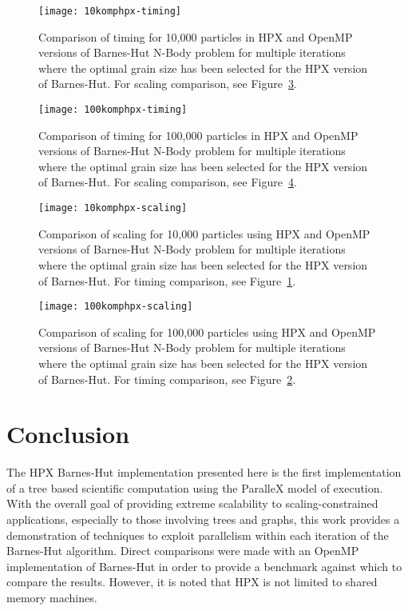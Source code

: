 \documentclass[floatfix]{revtex4}
\begin{document}
 \begin{figure}[htp]
\centering
\texttt{[image: 10komphpx-timing]}
\caption{Comparison of timing for 10,000 particles in HPX and OpenMP versions of Barnes-Hut N-Body problem for 
multiple iterations where the optimal grain size has been selected for the HPX version of Barnes-Hut. 
For scaling comparison, see Figure~\ref{10komphpx-scaling}.}
\label{10komphpx-timing}
\end{figure}

 \begin{figure}[htp]
\centering
\texttt{[image: 100komphpx-timing]}
\caption{Comparison of timing for 100,000 particles in HPX and OpenMP versions of Barnes-Hut N-Body problem for 
multiple iterations where the optimal grain size has been selected for the HPX version of Barnes-Hut. 
For scaling comparison, see Figure~\ref{100komphpx-scaling}.}
\label{100komphpx-timing}
\end{figure}

 \begin{figure}[htp]
\centering
\texttt{[image: 10komphpx-scaling]}
\caption{Comparison of scaling for 10,000 particles using HPX and OpenMP versions of Barnes-Hut N-Body problem for 
multiple iterations where the optimal grain size has been selected for the HPX version of Barnes-Hut. 
For timing comparison, see Figure~\ref{10komphpx-timing}.}
\label{10komphpx-scaling}
\end{figure}

 \begin{figure}[htp]
\centering
\texttt{[image: 100komphpx-scaling]}
\caption{Comparison of scaling for 100,000 particles using HPX and OpenMP versions of Barnes-Hut N-Body problem for 
multiple iterations where the optimal grain size has been selected for the HPX version of Barnes-Hut. 
For timing comparison, see Figure~\ref{100komphpx-timing}.}
\label{100komphpx-scaling}
\end{figure}


\section{Conclusion}
\label{conclusion}
The HPX Barnes-Hut implementation presented here is the first implementation 
of a tree based scientific computation using the ParalleX model of execution.
With the overall goal
of providing extreme scalability to scaling-constrained applications, especially to those 
involving trees and graphs, this
work provides a demonstration of techniques to exploit parallelism within each iteration of the 
Barnes-Hut algorithm. 
Direct comparisons were made with an OpenMP implementation of Barnes-Hut in order to provide a benchmark
against which to compare the results. However, it is noted that HPX is not limited to shared memory machines.
\end{document}
